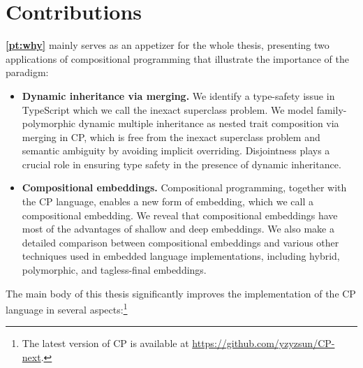 \section{Contributions}

\textbf{\autoref{pt:why}} mainly serves as an appetizer for the whole thesis,
presenting two applications of compositional programming that illustrate the
importance of the paradigm:
\begin{itemize}
\item \textbf{Dynamic inheritance via merging.} We identify a type-safety issue
      in TypeScript which we call the inexact superclass problem. We model
      family-polymorphic dynamic multiple inheritance as nested trait
      composition via merging in CP, which is free from the inexact superclass
      problem and semantic ambiguity by avoiding implicit overriding.
      Disjointness plays a crucial role in ensuring type safety in the presence
      of dynamic inheritance.
\item \textbf{Compositional embeddings.} Compositional programming, together
      with the CP language, enables a new form of embedding, which we call a
      compositional embedding. We reveal that compositional embeddings have most
      of the advantages of shallow and deep embeddings. We also make a detailed
      comparison between compositional embeddings and various other techniques
      used in embedded language implementations, including hybrid, polymorphic,
      and tagless-final embeddings.
\end{itemize}
The main body of this thesis significantly improves the implementation of the CP
language in several aspects:\footnote{The latest version of CP is available at
\url{https://github.com/yzyzsun/CP-next}.}
